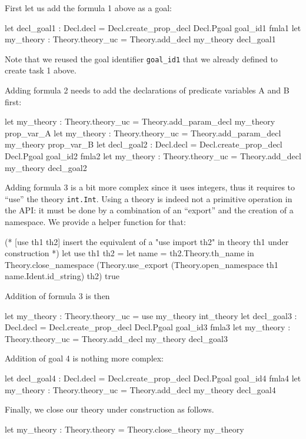 First let us add the formula 1 above as a goal:
\begin{ocamlcode}
let decl_goal1 : Decl.decl =
  Decl.create_prop_decl Decl.Pgoal goal_id1 fmla1 
let my_theory : Theory.theory_uc =
  Theory.add_decl my_theory decl_goal1
\end{ocamlcode}
Note that we reused the goal identifier \verb|goal_id1| that we
already defined to create task 1 above.

Adding formula 2 needs to add the declarations of predicate variables A
and B first:
\begin{ocamlcode}
let my_theory : Theory.theory_uc = 
  Theory.add_param_decl my_theory prop_var_A 
let my_theory : Theory.theory_uc = 
  Theory.add_param_decl my_theory prop_var_B 
let decl_goal2 : Decl.decl =
  Decl.create_prop_decl Decl.Pgoal goal_id2 fmla2 
let my_theory : Theory.theory_uc = Theory.add_decl my_theory decl_goal2
\end{ocamlcode}

Adding formula 3 is a bit more complex since it uses integers, thus it
requires to ``use'' the theory \verb|int.Int|. Using a theory is
indeed not a primitive operation in the API: it must be done by a
combination of an ``export'' and the creation of a namespace. We
provide a helper function for that:
\begin{ocamlcode}
(* [use th1 th2] insert the equivalent of a "use import th2" in
  theory th1 under construction *) 
let use th1 th2 = 
  let name = th2.Theory.th_name in 
  Theory.close_namespace 
    (Theory.use_export 
      (Theory.open_namespace th1 name.Ident.id_string) th2) true
\end{ocamlcode}
Addition of formula 3 is then
\begin{ocamlcode}
let my_theory : Theory.theory_uc = use my_theory int_theory
let decl_goal3 : Decl.decl = 
  Decl.create_prop_decl Decl.Pgoal goal_id3 fmla3
let my_theory : Theory.theory_uc = 
  Theory.add_decl my_theory decl_goal3  
\end{ocamlcode}

Addition of goal 4 is nothing more complex:
\begin{ocamlcode}
let decl_goal4 : Decl.decl = 
  Decl.create_prop_decl Decl.Pgoal goal_id4 fmla4
let my_theory : 
  Theory.theory_uc = Theory.add_decl my_theory decl_goal4  
\end{ocamlcode}

Finally, we close our theory under construction as follows.
\begin{ocamlcode}
let my_theory : Theory.theory = Theory.close_theory my_theory  
\end{ocamlcode}

